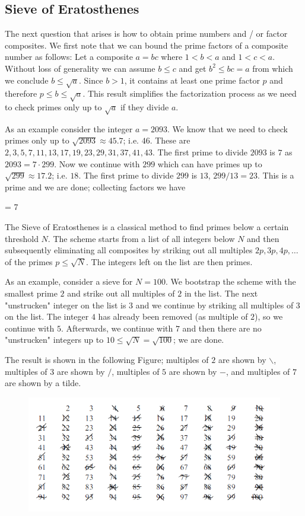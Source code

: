 \subsection{Sieve of Eratosthenes}

The next question that arises is how to obtain prime numbers and / or factor composites. We first note that we can bound the prime factors of a composite number as follows: Let a composite $a = bc$ where $1 < b < a$ and $1 < c < a$. Without loss of generality we can assume $b \leq c$ and get $b^2 \leq bc = a$ from which we conclude $b \leq \sqrt{a}$. Since $b > 1$, it contains at least one prime factor $p$ and therefore $p \leq b \leq \sqrt{a}$. This result simplifies the factorization process as we need to check primes only up to $\sqrt{a}$ if they divide $a$.

As an example consider the integer $a = 2093$. We know that we need to check primes only up to $\sqrt{2093} \approx 45.7$; i.e. $46$. These are $2, 3, 5, 7, 11, 13, 17, 19, 23, 29, 31, 37, 41, 43$. The first prime to divide $2093$ is $7$ as $2093 = 7 \cdot 299$. Now we continue with $299$ which can have primes up to $\sqrt{299} \approx 17.2$; i.e. $18$. The first prime to divide $299$ is $13$, $299 / 13 = 23$. This is a prime and we are done; collecting factors we have

 = 7  
\eee

The Sieve of Eratosthenes is a classical method to find primes below a certain threshold $N$. The scheme starts from a list of all integers below $N$ and then subsequently eliminating all composites by striking out all multiples $2p, 3p, 4p, \ldots$ of the primes $p \leq \sqrt{N}$. The integers left on the list are then primes.

As an example, consider a sieve for $N = 100$. We bootstrap the scheme with the smallest prime $2$ and strike out all multiples of $2$ in the list. The next "unstrucken" integer on the list is $3$ and we continue by striking all multiples of $3$ on the list. The integer $4$ has already been removed (as multiple of $2$), so we continue with $5$. Afterwards, we continue with $7$ and then there are no "unstrucken" integers up to $10 \leq \sqrt{N} = \sqrt{100}$; we are done.

The result is shown in the following Figure; multiples of $2$ are shown by $\backslash$, multiples of $3$ are shown by $/$, multiples of $5$ are shown by $-$, and multiples of $7$ are shown by a tilde.

\begin{figure}[H]
    \centering
    \includegraphics[scale=0.75]{images/primes_01_01.png}
\end{figure}


